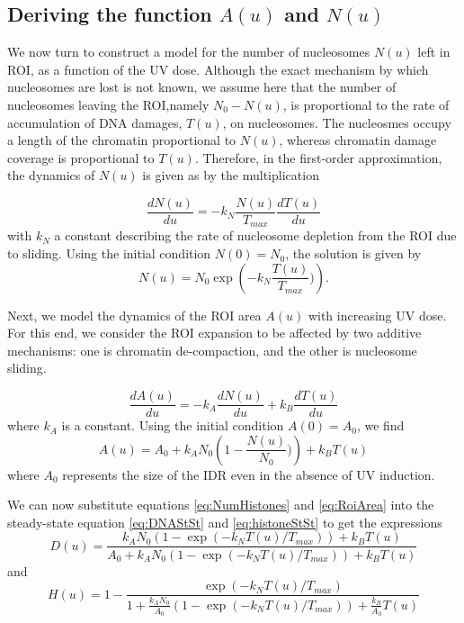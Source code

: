 \documentclass[12pt]{article}
\begin{document}
\subsection{Deriving the function $A(u)$ and $N(u)$}
We now turn to construct a model for the number of nucleosomes $N(u)$ left in ROI, as a function of the UV dose. Although the exact mechanism by which nucleosomes are lost is not known, we assume here that the number of nucleosomes leaving the ROI,namely  $N_0-N(u)$, is proportional to the rate of accumulation of DNA damages, $T(u)$, on nucleosomes. The nucleosmes occupy a length of the chromatin proportional to $N(u)$, whereas chromatin damage coverage is proportional to $T(u)$. Therefore, in the first-order approximation, the dynamics of $N(u)$ is given as by the multiplication 

\begin{equation*}
\frac{dN(u)}{du} = -k_N\frac{N(u)}{T_{max}}\frac{dT(u)}{du}
\end{equation*}
with $k_N$ a constant describing the rate of nucleosome depletion from the ROI due to sliding. Using the initial condition $N(0) = N_0$, the solution is given by
\begin{equation}\label{eq:NumHistones}
N(u) = N_0\exp\left(-k_N\frac{T(u)}{T_{max}})\right).
\end{equation}

Next, we model the dynamics of the ROI area $A(u)$ with increasing UV dose.  For this end, we consider the ROI expansion to be affected by two additive mechanisms: one is chromatin de-compaction, and the other is nucleosome sliding. 

\begin{equation}\label{dralpha}
\frac{dA(u)}{du}=-k_A\frac{dN(u)}{du}+k_B\frac{dT(u)}{du}
\end{equation}
where $k_A$ is a constant. Using the initial condition $A(0)=A_0$, we find 
\begin{equation}\label{eq:RoiArea}
A(u) = A_0 +k_AN_0\left(1-\frac{N(u)}{N_0})\right) +k_BT(u)
\end{equation}
where $A_0$ represents the size of the IDR even in the absence of UV induction.

We can now substitute equations \ref{eq:NumHistones} and \ref{eq:RoiArea} into the steady-state equation \ref{eq:DNAStSt} and \ref{eq:histoneStSt} to get the expressions 
\begin{equation}
\label{eq:DnaLoss}
D(u) = \frac{k_AN_0\left(1-\exp\left(-k_NT(u)/T_{max}\right)\right) +k_BT(u)}{A_0+k_AN_0\left(1-\exp\left(-k_NT(u)/T_{max}\right)\right) +k_BT(u)}
\end{equation}
and 
\begin{equation}\label{eq:histoneLoss}
H(u) = 1- \frac{\exp\left(-k_NT(u)/T_{max}\right)}{1+\frac{k_AN_0}{A_0}\left(1-\exp\left(-k_NT(u)/T_{max}\right)\right) +\frac{k_B}{A_0}T(u)}
\end{equation}
\end{document}
